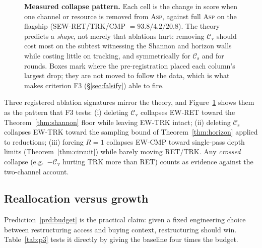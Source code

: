 \documentclass[10pt]{article}
\theoremstyle{definition}
\theoremstyle{plain}
\newcommand{\ASP}{\textsc{Asp}}
\newcommand{\cs}{\mathcal{C}_{\mathrm{s}}}
\newcommand{\cv}{\mathcal{C}_{\mathrm{v}}}
\begin{document}
\begin{figure}[!t]
\caption{\textbf{Measured collapse pattern.} Each cell is the change in score when one channel or resource is removed from \ASP{}, against full \ASP{} on the flagship (SEW-RET/TRK/CMP $=93.8/4.2/20.8$). The theory predicts a \emph{shape}, not merely that ablations hurt: removing $\cv$ should cost most on the subtest witnessing the Shannon and horizon walls while costing little on tracking, and symmetrically for $\cs$ and for rounds. Boxes mark where the pre-registration placed each column's largest drop; they are not moved to follow the data, which is what makes criterion F3 (\S\ref{sec:falsify}) able to fire.}
\label{fig:collapse}
\end{figure}
Three registered ablation signatures mirror the theory, and Figure~\ref{fig:collapse} shows them as the pattern that F3 tests: (i) deleting $\cv$ collapses EW-RET toward the Theorem~\ref{thm:shannon} floor while leaving EW-TRK intact; (ii) deleting $\cs$ collapses EW-TRK toward the sampling bound of Theorem~\ref{thm:horizon} applied to reductions; (iii) forcing $R{=}1$ collapses EW-CMP toward single-pass depth limits (Theorem~\ref{thm:circuit}) while barely moving RET/TRK. Any \emph{crossed} collapse (e.g.\ $-\cv$ hurting TRK more than RET) counts as evidence against the two-channel account.

\subsection{Reallocation versus growth}
Prediction~\ref{prd:budget} is the practical claim: given a fixed engineering choice between restructuring access and buying context, restructuring should win. Table~\ref{tab:p3} tests it directly by giving the baseline four times the budget.
\end{document}
